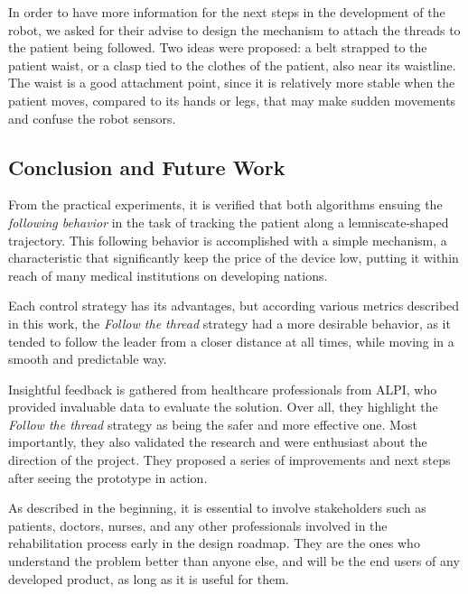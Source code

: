 \documentclass[journal]{IEEEtran}
\begin{document}
In order to have more information for the next steps in the development of the robot, we asked for their advise to design the mechanism to attach the threads to the patient being followed. Two ideas were proposed: a belt strapped to the patient waist, or a clasp tied to the clothes of the patient, also near its waistline. The waist is a good attachment point, since it is relatively more stable when the patient moves, compared to its hands or legs, that may make sudden movements and confuse the robot sensors. 


\subsection{Conclusion and Future Work}
\label{conclusion}

From the practical experiments, it is verified that both algorithms ensuing the \textit{following behavior}  in the task of tracking the patient along a lemniscate-shaped trajectory. This following behavior is accomplished with a simple mechanism, a characteristic that significantly keep the price of the device low, putting it within reach of many medical institutions on developing nations.

Each control strategy has its advantages, but according various metrics described in this work, the \textit{Follow the thread} strategy had a more desirable behavior, as it tended to follow the leader from a closer distance at all times, while moving in a smooth and predictable way. 

Insightful feedback is gathered from healthcare professionals from ALPI, who provided invaluable data to evaluate the solution. Over all, they highlight the \textit{Follow the thread} strategy as being the safer and more effective one. Most importantly, they also validated the research and were enthusiast about the direction of the project. They proposed a series of improvements and next steps after seeing the prototype in action.

As described in the beginning, it is essential to involve stakeholders such as patients, doctors, nurses, and any other professionals involved in the rehabilitation process early in the design roadmap. They are the ones who understand the problem better than anyone else, and will be the end users of any developed product, as long as it is useful for them.

\end{document}
